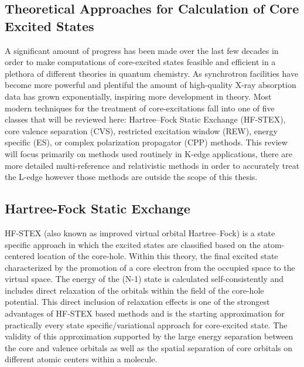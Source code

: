 \documentclass[final]{emory}
\begin{document}
\subsection{Theoretical Approaches for Calculation of Core Excited States}
A significant amount of progress has been made over the last few decades in order to make computations of core-excited states feasible and efficient in a plethora of different theories in quantum chemistry. As synchrotron facilities have become more powerful and plentiful the amount of high-quality X-ray absorption data has grown exponentially, inspiring more development in theory. Most modern techniques for the treatment of core-excitations fall into one of five classes that will be reviewed here: Hartree--Fock Static Exchange (HF-STEX), core valence separation (CVS), restricted excitation window (REW), energy specific (ES), or complex polarization propagator (CPP) methods. This review will focus primarily on methods used routinely in K-edge applications, there are more detailed multi-reference and relativistic methods in order to accurately treat the L-edge however those methods are outside the scope of this thesis. 
\subsection{Hartree-Fock Static Exchange}
HF-STEX (also known as improved virtual orbital Hartree--Fock) is a state specific approach in which the excited states are classified based on the atom-centered location of the core-hole. Within this theory, the final excited state characterized by the promotion of a core electron from the occupied space to the virtual space. The energy of the (N-1) state is calculated self-consistently and includes direct relaxation of the orbitals within the field of the core-hole potential. This direct inclusion of relaxation effects is one of the strongest advantages of HF-STEX based methods and is the starting approximation for practically every state specific/variational approach for core-excited state. The validity of this approximation supported by the large energy separation between the core and valence orbitals as well as the spatial separation of core orbitals on different atomic centers within a molecule.  
\end{document}
